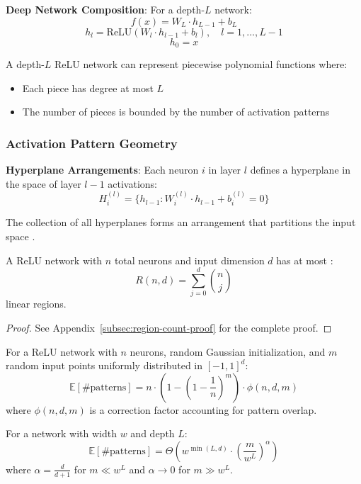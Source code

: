 \textbf{Deep Network Composition}: For a depth-$L$ network:
$$f(x) = W_L \cdot h_{L-1} + b_L$$
$$h_l = \text{ReLU}(W_l \cdot h_{l-1} + b_l), \quad l = 1, ..., L-1$$
$$h_0 = x$$

\begin{proposition}
A depth-$L$ ReLU network can represent piecewise polynomial functions where:
\begin{itemize}
    \item Each piece has degree at most $L$
    \item The number of pieces is bounded by the number of activation patterns
\end{itemize}
\end{proposition}

\subsubsection{Activation Pattern Geometry}

\textbf{Hyperplane Arrangements}: Each neuron $i$ in layer $l$ defines a hyperplane in the space of layer $l-1$ activations:
$$H_i^{(l)} = \{h_{l-1} : W_i^{(l)} \cdot h_{l-1} + b_i^{(l)} = 0\}$$

The collection of all hyperplanes forms an arrangement that partitions the input space \cite{Stanley2007AnIT, Orlik1992ArrangementsOH}.

\begin{theorem}
A ReLU network with $n$ total neurons and input dimension $d$ has at most \cite{Montfar2014OnTN}:
$$R(n,d) = \sum_{j=0}^d \binom{n}{j}$$
linear regions.
\end{theorem}

\begin{proof}
See Appendix~\ref{subsec:region-count-proof} for the complete proof.
\end{proof}

\begin{theorem}
For a ReLU network with $n$ neurons, random Gaussian initialization, and $m$ random input points uniformly distributed in $[-1,1]^d$:
$$\mathbb{E}[\#\text{patterns}] = n \cdot \left(1 - \left(1 - \frac{1}{n}\right)^m\right) \cdot \phi(n,d,m)$$
where $\phi(n,d,m)$ is a correction factor accounting for pattern overlap.
\end{theorem}

\begin{theorem}
For a network with width $w$ and depth $L$:
$$\mathbb{E}[\#\text{patterns}] = \Theta\left(w^{\min(L, d)} \cdot \left(\frac{m}{w^L}\right)^{\alpha}\right)$$
where $\alpha = \frac{d}{d+1}$ for $m \ll w^L$ and $\alpha \to 0$ for $m \gg w^L$.
\end{theorem}

